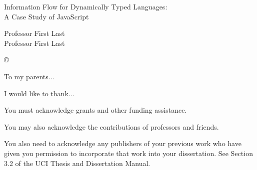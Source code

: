 \documentclass[12pt,fleqn]{ucithesis}
\begin{document}
\thesistitle
{
	Information Flow for Dynamically Typed Languages:\\
	A Case Study of JavaScript
}




\othercommitteemembers
{
	Professor First Last\\
	Professor First Last
}


\copyrightdeclaration
{
	{\copyright} {\Degreeyear} \Authorname
}


\dedications
{
	To my parents...
}

\acknowledgments
{
	I would like to thank...

	You must acknowledge grants and other funding assistance. 

	You may also acknowledge the contributions of professors and friends. 
	
	You also need to acknowledge any publishers of your previous work who have given you permission to incorporate that work into your dissertation. See Section 3.2 of the UCI Thesis and Dissertation Manual.
}
\end{document}
